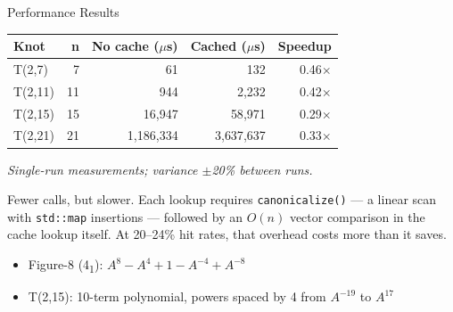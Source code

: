 \documentclass[final]{beamer}
\newlength{\colwidth}
\begin{document}
\begin{frame}[t,fragile]
\begin{columns}[t]
\begin{column}{\colwidth}
\begin{block}{Performance Results}
    \begin{center}
    \end{center}

    \vspace{0.1cm}
    \begin{center}
    \footnotesize
    \begin{tabular}{lrrrr}
    \toprule
    \textbf{Knot} & \textbf{n} & \textbf{No cache ($\mu$s)} & \textbf{Cached ($\mu$s)} & \textbf{Speedup} \\
    \midrule
    T(2,7)  &  7 &         61 &         132 & 0.46$\times$ \\
    T(2,11) & 11 &        944 &       2{,}232 & 0.42$\times$ \\
    T(2,15) & 15 &     16{,}947 &      58{,}971 & 0.29$\times$ \\
    T(2,21) & 21 & 1{,}186{,}334 & 3{,}637{,}637 & 0.33$\times$ \\
    \bottomrule
    \end{tabular}
    \end{center}
    \textit{\footnotesize Single-run measurements; variance $\pm$20\% between runs.}

    \vspace{0.1cm}
    Fewer calls, but slower. Each lookup requires \texttt{canonicalize()} --- a linear scan with \texttt{std::map} insertions --- followed by an $O(n)$ vector comparison in the cache lookup itself. At 20--24\% hit rates, that overhead costs more than it saves.

    \vspace{0.1cm}
    \begin{itemize}\setlength\itemsep{0pt}
      \item Figure-8 (4\textsubscript{1}): $A^8 - A^4 + 1 - A^{-4} + A^{-8}$ \checkmark
      \item T(2,15): 10-term polynomial, powers spaced by 4 from $A^{-19}$ to $A^{17}$ \checkmark
    \end{itemize}
  \end{block}


\end{column}
\end{columns}
\end{frame}
\end{document}
